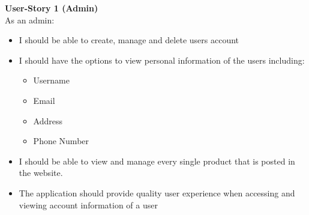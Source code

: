 \documentclass[11pt]{article}
\newcounter{use case ID}
\begin{document}
\textbf{User-Story 1 (Admin)} \\
As an admin:
\begin{itemize}
    \item I should be able to create, manage and delete users account
    \item I should have the options to view personal information of the users including:
        \begin{itemize}
            \item Username
            \item Email
            \item Address
            \item Phone Number
        \end{itemize}
    \item I should be able to view and manage every single product that is posted in the website.
    \item The application should provide quality user experience when accessing and viewing account information of a user
\end{itemize}
\end{document}
